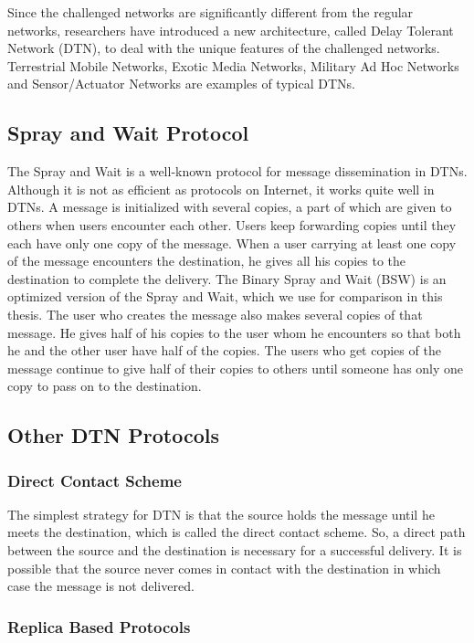 Since the challenged networks are significantly different from the regular networks, researchers have introduced a new architecture, called Delay Tolerant Network (DTN), to deal with the unique features of the challenged networks. Terrestrial Mobile Networks, Exotic Media Networks, Military Ad Hoc Networks and Sensor/Actuator Networks are examples of typical DTNs.


\subsection{ Spray and Wait Protocol}

\noindent The Spray and Wait \cite{C31} is a well-known protocol for message dissemination in DTNs. Although it is not as efficient as protocols on Internet, it works quite well in DTNs. A message is initialized with several copies, a part of which are given to others when users encounter each other. Users keep forwarding copies until they each have only one copy of the message. When a user carrying at least one copy of the message encounters the destination, he gives all his copies to the destination to complete the delivery. The Binary Spray and Wait (BSW) \cite{C31} is an optimized version of the Spray and Wait, which we use for comparison in this thesis. The user who creates the message also makes several copies of that message. He gives half of his copies to the user whom he encounters so that both he and the other user have half of the copies. The users who get copies of the message continue to give half of their copies to others until someone has only one copy to pass on to the destination.

\subsection{ Other DTN Protocols}


\subsubsection{ Direct Contact Scheme}

\noindent The simplest strategy for DTN is that the source holds the message until he meets the destination, which is called the direct contact scheme. So, a direct path between the source and the destination is necessary for a successful delivery. It is possible that the source never comes in contact with the destination in which case the message is not delivered. 


\subsubsection{ Replica Based Protocols}

